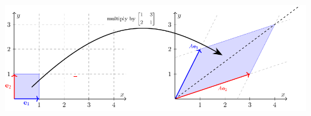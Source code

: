 \documentclass[10pt]{article}
\theoremstyle{definition}
\begin{document}
\begin{center}
  \includegraphics[scale=.4]{linear-transformation-first-exampled-flipped.png}
\end{center}

  

\end{document}
